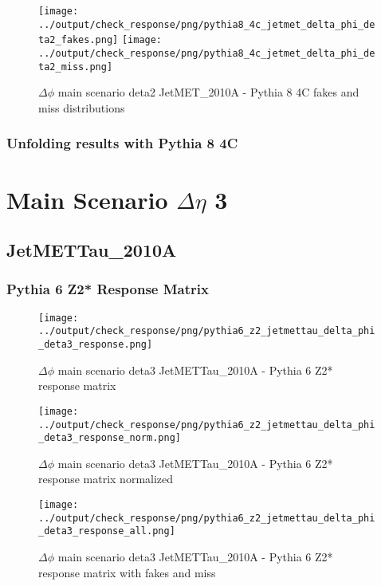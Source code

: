 \documentclass[11pt]{book}
\begin{document}
\begin{figure}[ht]
\centering
\texttt{[image: ../output/check\_response/png/pythia8\_4c\_jetmet\_delta\_phi\_deta2\_fakes.png]}
\texttt{[image: ../output/check\_response/png/pythia8\_4c\_jetmet\_delta\_phi\_deta2\_miss.png]}
\caption{$\Delta\phi$ main scenario deta2 JetMET\_2010A - Pythia 8 4C fakes and miss distributions}
\label{p8_jetmet_delta_phi_deta2_fakesmiss}
\end{figure}


\clearpage
\subsection{Unfolding results with Pythia 8 4C}



\newpage
\chapter{Main Scenario $\Delta\eta$ 3 }
\section{JetMETTau\_2010A}
\subsection{Pythia 6 Z2* Response Matrix}

\begin{figure}[ht]
\centering
\texttt{[image: ../output/check\_response/png/pythia6\_z2\_jetmettau\_delta\_phi\_deta3\_response.png]}
\caption{$\Delta\phi$ main scenario deta3 JetMETTau\_2010A - Pythia 6 Z2* response matrix}
\label{p6_jetmettau_delta_phi_deta3_response}
\end{figure}

\begin{figure}[ht]
\centering
\texttt{[image: ../output/check\_response/png/pythia6\_z2\_jetmettau\_delta\_phi\_deta3\_response\_norm.png]}
\caption{$\Delta\phi$ main scenario deta3 JetMETTau\_2010A - Pythia 6 Z2* response matrix normalized}
\label{p6_jetmettau_delta_phi_deta3_response_norm}
\end{figure}

\begin{figure}[ht]
\centering
\texttt{[image: ../output/check\_response/png/pythia6\_z2\_jetmettau\_delta\_phi\_deta3\_response\_all.png]}
\caption{$\Delta\phi$ main scenario deta3 JetMETTau\_2010A - Pythia 6 Z2* response matrix with fakes and miss}
\label{p6_jetmettau_delta_phi_deta3_response_all}
\end{figure}
\end{document}
